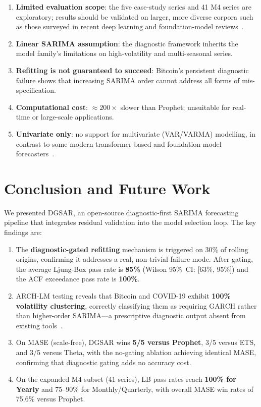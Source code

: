 \documentclass[sn-mathphys-num,pdflatex]{sn-jnl}
\begin{document}
\begin{enumerate}
\item \textbf{Limited evaluation scope}: the five case-study series
and 41 M4 series are exploratory; results should be validated
on larger, more diverse corpora such as those surveyed in recent
deep learning and foundation-model reviews~\cite{kim2025deeplearningsurvey, kottapalli2025survey}.
\item \textbf{Linear SARIMA assumption}: the diagnostic framework
inherits the model family's limitations on high-volatility
and multi-seasonal series.
\item \textbf{Refitting is not guaranteed to succeed}: Bitcoin's
persistent diagnostic failure shows that increasing SARIMA
order cannot address all forms of mis-specification.
\item \textbf{Computational cost}: ${\approx}200\times$ slower than
Prophet; unsuitable for real-time or large-scale applications.
\item \textbf{Univariate only}: no support for multivariate
(VAR/VARMA) modelling, in contrast to some modern
transformer-based and foundation-model forecasters~\cite{lim2021tft, zhou2021informer, wu2021autoformer, nie2022patchtst, zhou2023itransformer, ansari2024chronos, das2024timesfm, fu2026reverso}.
\end{enumerate}

\section{Conclusion and Future Work}
\label{sec:conclusion}

We presented DGSAR, an open-source diagnostic-first SARIMA
forecasting pipeline that integrates residual validation into the
model selection loop. The key findings are:

\begin{enumerate}
\item The \textbf{diagnostic-gated refitting} mechanism is triggered
on 30\% of rolling origins, confirming it addresses a real,
non-trivial failure mode. After gating, the average Ljung-Box
pass rate is \textbf{85\%} (Wilson 95\%~CI: [63\%, 95\%]) and
the ACF exceedance pass rate is \textbf{100\%}.
\item ARCH-LM testing reveals that Bitcoin and COVID-19 exhibit
\textbf{100\% volatility clustering}, correctly classifying
them as requiring GARCH rather than higher-order SARIMA---a
prescriptive diagnostic output absent from existing tools~\cite{engle1982, bollerslev1986garch}.
\item On MASE (scale-free), DGSAR wins \textbf{5/5 versus
Prophet}, 3/5 versus ETS, and 3/5 versus Theta, with the
no-gating ablation achieving identical MASE, confirming that
diagnostic gating adds no accuracy cost.
\item On the expanded M4 subset (41 series), LB pass rates reach
\textbf{100\% for Yearly} and 75--90\% for Monthly/Quarterly,
with overall MASE win rates of 75.6\% versus Prophet.
\end{enumerate}
\end{document}

